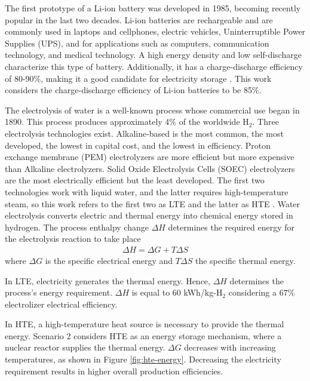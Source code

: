 \documentclass{anstrans}
\begin{document}
The first prototype of a Li-ion battery was developed in 1985, becoming recently popular in the last two decades.
Li-ion batteries are rechargeable and are commonly used in laptops and cellphones, electric vehicles, Uninterruptible Power Supplies (UPS), and for applications such as computers, communication technology, and medical technology.
A high energy density and low self-discharge characterize this type of battery.
Additionally, it has a charge-discharge efficiency of 80-90\%, making it a good candidate for electricity storage \cite{sun_car_2010}.
This work considers the charge-discharge efficiency of Li-ion batteries to be 85\%.

The electrolysis of water is a well-known process whose commercial use began in 1890.
This process produces approximately 4\% of the worldwide H$_2$.
Three electrolysis technologies exist.
Alkaline-based is the most common, the most developed, the lowest in capital cost, and the lowest in efficiency.
Proton exchange membrane (PEM) electrolyzers are more efficient but more expensive than Alkaline electrolyzers.
Solid Oxide Electrolysis Cells (SOEC) electrolyzers are the most electrically efficient but the least developed.
The first two technologies work with liquid water, and the latter requires high-temperature steam, so this work refers to the first two as \gls{LTE} and the latter as \gls{HTE} \cite{fairhurst-agosta_multi-physics_2020}.
Water electrolysis converts electric and thermal energy into chemical energy stored in hydrogen.
The process enthalpy change $\Delta H$ determines the required energy for the electrolysis reaction to take place
\begin{align}
  \Delta H = \Delta G + T \Delta S
\end{align}
where $\Delta G$ is the specific electrical energy and $T \Delta S$ the specific thermal energy.

In LTE, electricity generates the thermal energy.
Hence, $\Delta H$ determines the process’s energy requirement.
$\Delta H$ is equal to 60 kWh/kg-H$_2$ considering a 67\% electrolizer electrical efficiency.

In HTE, a high-temperature heat source is necessary to provide the thermal energy.
Scenario 2 considers HTE as an energy storage mechanism, where a nuclear reactor supplies the thermal energy.
$\Delta G$ decreases with increasing temperatures, as shown in Figure \ref{fig:hte-energy}.
Decreasing the electricity requirement results in higher overall production efficiencies.
\end{document}
